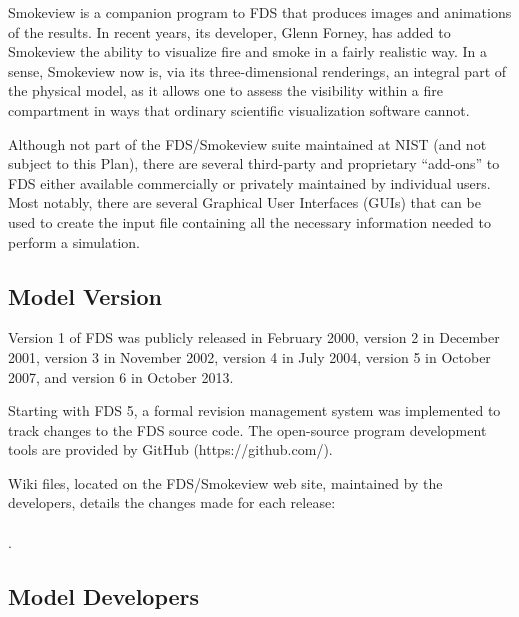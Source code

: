 \documentclass[11pt]{book}
\begin{document}
Smokeview is a companion program to FDS that produces images and animations of the results. In recent years, its developer, Glenn Forney, has added
to Smokeview the ability to visualize fire and smoke in a fairly realistic way. In a sense, Smokeview now is, via its three-dimensional renderings,
an integral part of the physical model, as it allows one to assess the visibility within a fire compartment in ways that ordinary scientific
visualization software cannot.

Although not part of the FDS/Smokeview suite maintained at NIST (and not subject to this Plan), there are several third-party and proprietary ``add-ons'' to FDS either available
commercially or privately maintained by individual users. Most notably, there are several Graphical User Interfaces (GUIs) that can be used to create
the input file containing all the necessary information needed to perform a simulation.



\subsection{Model Version}

Version 1 of FDS was publicly released in February 2000, version 2 in December 2001, version 3 in November 2002, version 4 in July 2004, version 5 in October 2007, and version 6 in October 2013.

Starting with FDS 5, a formal revision management system was implemented to track changes to the FDS source code. The open-source program development tools are provided by GitHub (https://github.com/).

Wiki files, located on the FDS/Smokeview web site, maintained by the developers, details the changes made for each release: \\ \href{https://github.com/firemodels/fds/wiki/Release-Notes}{} \\ \href{https://github.com/firemodels/smv/wiki/Release-Notes}{}.


\subsection{Model Developers}
\end{document}
